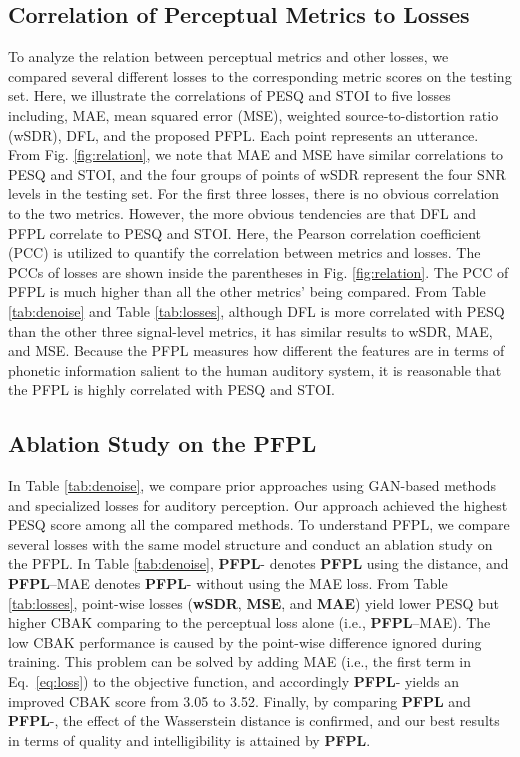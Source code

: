\documentclass[a4paper]{article}
\begin{document}
\subsection{Correlation of Perceptual Metrics to Losses}
\label{ssec:relation_of_pesq_to_losses}
To analyze the relation between perceptual metrics and other losses, we compared several different losses to the corresponding metric scores on the testing set. Here, we illustrate the correlations of PESQ and STOI to five losses including, MAE, mean squared error (MSE), weighted source-to-distortion ratio (wSDR), DFL, and the proposed PFPL. Each point represents an utterance. From Fig. \ref{fig:relation}, we note that MAE and MSE have similar correlations to PESQ and STOI, and the four groups of points of wSDR represent the four SNR levels in the testing set. For the first three losses, there is no obvious correlation to the two metrics. However, the more obvious tendencies are that DFL and PFPL correlate to PESQ and STOI. Here, the Pearson correlation coefficient (PCC) is utilized to quantify the correlation between metrics and losses. The PCCs of losses are shown inside the parentheses in Fig. \ref{fig:relation}. The PCC of PFPL is much higher than all the other metrics' being compared. From Table \ref{tab:denoise} and Table \ref{tab:losses}, although DFL is more correlated with PESQ than the other three signal-level metrics, it has similar results to wSDR, MAE, and MSE. Because the PFPL measures how different the features are in terms of phonetic information salient to the human auditory system, it is reasonable that the PFPL is highly correlated with PESQ and STOI.
\subsection{Ablation Study on the PFPL}
\label{ssec:qualitative_analysis}
 In Table \ref{tab:denoise}, we compare prior approaches using GAN-based methods and specialized losses for auditory perception. Our approach achieved the highest PESQ score among all the compared methods. To understand PFPL, we compare several losses with the same model structure and conduct an ablation study on the PFPL. In Table \ref{tab:denoise}, {\bf PFPL}- denotes {\bf PFPL} using the  distance, and {\bf PFPL}--MAE denotes {\bf PFPL}- without using the MAE loss. From Table \ref{tab:losses}, point-wise losses (\textbf{wSDR}, \textbf{MSE}, and \textbf{MAE}) yield lower PESQ but higher CBAK comparing to the perceptual loss alone (i.e., {\bf PFPL}--MAE). The low CBAK performance is caused by the point-wise difference ignored during training. This problem can be solved by adding MAE (i.e., the first term in Eq.~\eqref{eq:loss}) to the objective function, and accordingly {\bf PFPL}- yields an improved CBAK score from 3.05 to 3.52. 
 Finally, by comparing {\bf PFPL} and {\bf PFPL}-,  the effect of the Wasserstein distance is confirmed, and our best results in terms of quality and intelligibility is attained by {\bf PFPL}.
\end{document}
